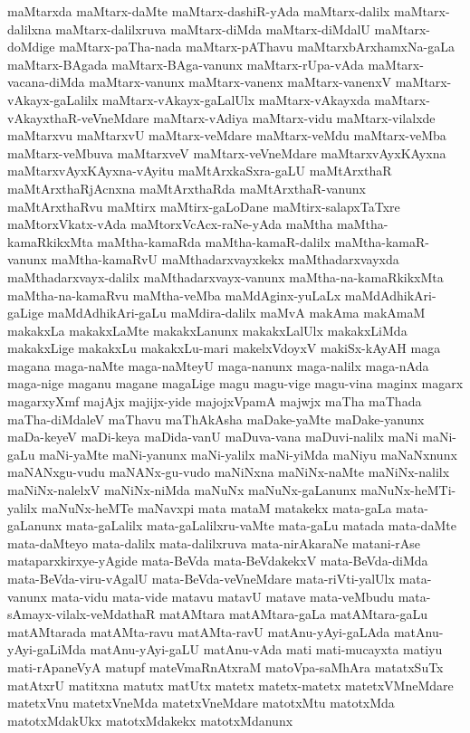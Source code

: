 {maMtarxda
maMtarx-daMte
maMtarx-dashiR-yAda
maMtarx-dalilx
maMtarx-dalilxna
maMtarx-dalilxruva
maMtarx-diMda
maMtarx-diMdalU
maMtarx-doMdige
maMtarx-paTha-nada
maMtarx-pAThavu
maMtarxbArxhamxNa-gaLa
maMtarx-BAgada
maMtarx-BAga-vanunx
maMtarx-rUpa-vAda
maMtarx-vacana-diMda
maMtarx-vanunx
maMtarx-vanenx
maMtarx-vanenxV
maMtarx-vAkayx-gaLalilx
maMtarx-vAkayx-gaLalUlx
maMtarx-vAkayxda
maMtarx-vAkayxthaR-veVneMdare
maMtarx-vAdiya
maMtarx-vidu
maMtarx-vilalxde
maMtarxvu
maMtarxvU
maMtarx-veMdare
maMtarx-veMdu
maMtarx-veMba
maMtarx-veMbuva
maMtarxveV
maMtarx-veVneMdare
maMtarxvAyxKAyxna
maMtarxvAyxKAyxna-vAyitu
maMtArxkaSxra-gaLU
maMtArxthaR
maMtArxthaRjAcnxna
maMtArxthaRda
maMtArxthaR-vanunx
maMtArxthaRvu
maMtirx
maMtirx-gaLoDane
maMtirx-salapxTaTxre
maMtorxVkatx-vAda
maMtorxVcAcx-raNe-yAda
maMtha
maMtha-kamaRkikxMta
maMtha-kamaRda
maMtha-kamaR-dalilx
maMtha-kamaR-vanunx
maMtha-kamaRvU
maMthadarxvayxkekx
maMthadarxvayxda
maMthadarxvayx-dalilx
maMthadarxvayx-vanunx
maMtha-na-kamaRkikxMta
maMtha-na-kamaRvu
maMtha-veMba
maMdAginx-yuLaLx
maMdAdhikAri-gaLige
maMdAdhikAri-gaLu
maMdira-dalilx
maMvA
makAma
makAmaM
makakxLa
makakxLaMte
makakxLanunx
makakxLalUlx
makakxLiMda
makakxLige
makakxLu
makakxLu-mari
makelxVdoyxV
makiSx-kAyAH
maga
magana
maga-naMte
maga-naMteyU
maga-nanunx
maga-nalilx
maga-nAda
maga-nige
maganu
magane
magaLige
magu
magu-vige
magu-vina
maginx
magarx
magarxyXmf
majAjx
majijx-yide
majojxVpamA
majwjx
maTha
maThada
maTha-diMdaleV
maThavu
maThAkAsha
maDake-yaMte
maDake-yanunx
maDa-keyeV
maDi-keya
maDida-vanU
maDuva-vana
maDuvi-nalilx
maNi
maNi-gaLu
maNi-yaMte
maNi-yanunx
maNi-yalilx
maNi-yiMda
maNiyu
maNaNxnunx
maNANxgu-vudu
maNANx-gu-vudo
maNiNxna
maNiNx-naMte
maNiNx-nalilx
maNiNx-nalelxV
maNiNx-niMda
maNuNx
maNuNx-gaLanunx
maNuNx-heMTi-yalilx
maNuNx-heMTe
maNavxpi
mata
mataM
matakekx
mata-gaLa
mata-gaLanunx
mata-gaLalilx
mata-gaLalilxru-vaMte
mata-gaLu
matada
mata-daMte
mata-daMteyo
mata-dalilx
mata-dalilxruva
mata-nirAkaraNe
matani-rAse
mataparxkirxye-yAgide
mata-BeVda
mata-BeVdakekxV
mata-BeVda-diMda
mata-BeVda-viru-vAgalU
mata-BeVda-veVneMdare
mata-riVti-yalUlx
mata-vanunx
mata-vidu
mata-vide
matavu
matavU
matave
mata-veMbudu
mata-sAmayx-vilalx-veMdathaR
matAMtara
matAMtara-gaLa
matAMtara-gaLu
matAMtarada
matAMta-ravu
matAMta-ravU
matAnu-yAyi-gaLAda
matAnu-yAyi-gaLiMda
matAnu-yAyi-gaLU
matAnu-vAda
mati
mati-mucayxta
matiyu
mati-rApaneVyA
matupf
mateVmaRnAtxraM
matoVpa-saMhAra
matatxSuTx
matAtxrU
matitxna
matutx
matUtx
matetx
matetx-matetx
matetxVMneMdare
matetxVnu
matetxVneMda
matetxVneMdare
matotxMtu
matotxMda
matotxMdakUkx
matotxMdakekx
matotxMdanunx
}
